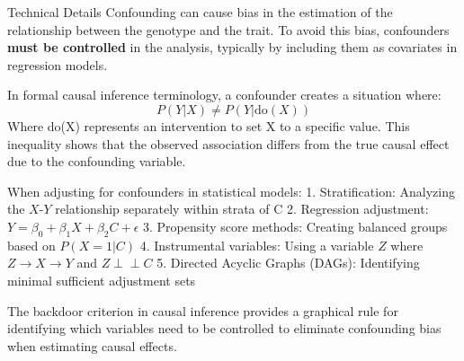 \begin{frame}{Technical Details}
Confounding can cause bias in the estimation of the relationship between the genotype and the trait. To avoid this bias, confounders \textbf{must be controlled} in the analysis, typically by including them as covariates in regression models.

In formal causal inference terminology, a confounder creates a situation where:
$$
P(Y|X) \neq P(Y|\text{do}(X))
$$
Where do(X) represents an intervention to set X to a specific value. This inequality shows that the observed association differs from the true causal effect due to the confounding variable.

When adjusting for confounders in statistical models:
1. Stratification: Analyzing the $X$-$Y$ relationship separately within strata of C
2. Regression adjustment: $Y = \beta_0 + \beta_1 X + \beta_2 C + \epsilon$
3. Propensity score methods: Creating balanced groups based on $P(X=1|C)$
4. Instrumental variables: Using a variable $Z$ where $Z→X→Y$ and $Z \perp \!\!\! \perp C$
5. Directed Acyclic Graphs (DAGs): Identifying minimal sufficient adjustment sets

The backdoor criterion in causal inference provides a graphical rule for identifying which variables need to be controlled to eliminate confounding bias when estimating causal effects.
\end{frame}

